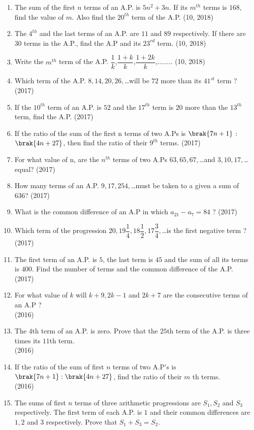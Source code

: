 \begin{enumerate}[label=\thesubsection.\arabic*,ref=\thesubsection.\theenumi,itemsep=1pt]
 \item The sum of the first $n$ terms of an A.P. is $5n^{2}+3n$. If its $m^{th}$ terms is $168$, find the value of $m$. Also find the $20^{th}$ term of the A.P.
\hfill (10, 2018) \item The $4^{th}$ and the last terms of an A.P. are $11$ and $89$ respectively. If there are $30$ terms in the A.P., find the A.P and its $23^{rd}$ term.
\hfill (10, 2018) \item Write the $m^{th}$ term of the A.P. $\dfrac{1}{k}$,$\dfrac{1+k}{k}$,$\dfrac{1+2k}{k}$,........
\hfill (10, 2018)
 \item Which term of the A.P. $8,14,20,26,$\ldots will be $72$ more than its $41^{st}$ term ?
\hfill(2017) \item If the $10^{th}$ term of an A.P. is $52$ and the $17^{th}$ term is $20$ more than the $13^{th}$ term, find the A.P.
\hfill(2017) \item If the ratio of the sum of the first n terms of two A.Ps is $\brak{7n + 1}$ : $\brak{4n + 27}$, then find the ratio of their $9^{th}$ terms.
\hfill(2017) \item For what value of n, are the $n^{th}$ terms of two A.Ps $63,65,67,$\ldots and $3,10, 17,$\ldots equal?
\hfill(2017) \item How many terms of an A.P. $9,17,254,$\ldots must be taken to a given a sum of $636$?
\hfill(2017) \item What is the common difference of an A.P in which $a_{21} - a_7 = 84$ ?
\hfill(2017) \item Which term of the progression $20,19\dfrac{1}{4},18\dfrac{1}{2},17\dfrac{3}{4},$\ldots is the first negative term ?
\hfill(2017) \item The first term of an A.P. is $5$, the last term is $45$ and the sum of all its terms is $400$. Find the number of terms and the common difference of the A.P.
\hfill(2017)
 \item For what value of $k$ will $k+9, 2k-1$ and $2k+7$ are the consecutive terms of an A.P ?\\
\hfill(2016) \item  The $4$th term of an A.P. is zero. Prove that the $25$th term of the A.P. is three times its $11$th term.\\
\hfill(2016) \item  If the ratio of the sum of first $n$ terms of two A.P's is $\brak{7n + 1} : \brak{4n + 27}$, find the ratio of their $m$ th terms.\\
\hfill(2016) \item The sums of first $n$ terms of three arithmetic progressions are $S_1, S_2$ and $S_3$ respectively. The first term of each A.P. is $1$ and their common differences are $1, 2$ and $3$ respectively. Prove that $S_1+S_3=S_2$.\\

\end{enumerate}
